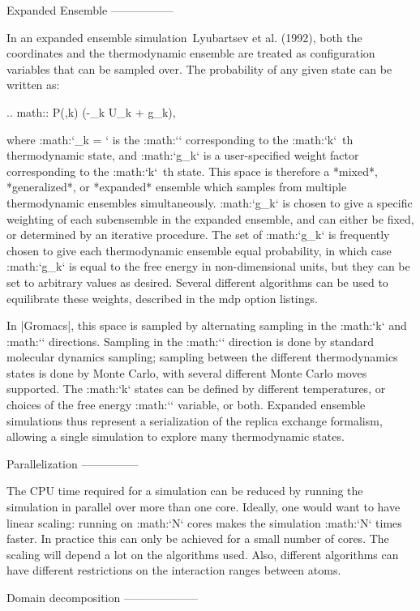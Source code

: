 {Expanded Ensemble
-----------------

In an expanded ensemble simulation Lyubartsev et al. (1992), both the
coordinates and the thermodynamic ensemble are treated as configuration
variables that can be sampled over. The probability of any given state
can be written as:

.. math:: P(,k) \propto \exp\left(-\beta_k U_k + g_k\right),

where :math:`\beta_k = ` is the :math:`\beta`
corresponding to the :math:`k`\ th thermodynamic state, and :math:`g_k`
is a user-specified weight factor corresponding to the :math:`k`\ th
state. This space is therefore a *mixed*, *generalized*, or *expanded*
ensemble which samples from multiple thermodynamic ensembles
simultaneously. :math:`g_k` is chosen to give a specific weighting of
each subensemble in the expanded ensemble, and can either be fixed, or
determined by an iterative procedure. The set of :math:`g_k` is
frequently chosen to give each thermodynamic ensemble equal probability,
in which case :math:`g_k` is equal to the free energy in non-dimensional
units, but they can be set to arbitrary values as desired. Several
different algorithms can be used to equilibrate these weights, described
in the mdp option listings.

In |Gromacs|, this space is sampled by
alternating sampling in the :math:`k` and :math:`` directions.
Sampling in the :math:`` direction is done by standard molecular
dynamics sampling; sampling between the different thermodynamics states
is done by Monte Carlo, with several different Monte Carlo moves
supported. The :math:`k` states can be defined by different
temperatures, or choices of the free energy :math:`\lambda` variable, or
both. Expanded ensemble simulations thus represent a serialization of
the replica exchange formalism, allowing a single simulation to explore
many thermodynamic states.

Parallelization
---------------

The CPU time required for a simulation can be reduced by running the
simulation in parallel over more than one core. Ideally, one would want
to have linear scaling: running on :math:`N` cores makes the simulation
:math:`N` times faster. In practice this can only be achieved for a
small number of cores. The scaling will depend a lot on the algorithms
used. Also, different algorithms can have different restrictions on the
interaction ranges between atoms.

Domain decomposition
--------------------

}
